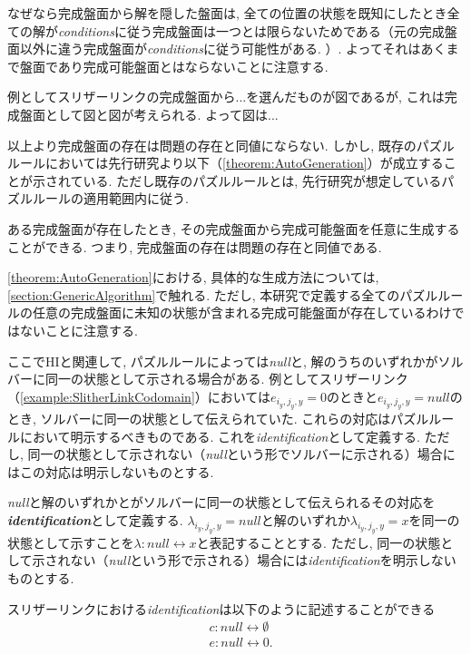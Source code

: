 なぜなら完成盤面から解を隠した盤面は, 全ての位置の状態を既知にしたとき全ての解が\textit{conditions}に従う完成盤面は一つとは限らないためである（元の完成盤面以外に違う完成盤面が\textit{conditions}に従う可能性がある. ）. よってそれはあくまで盤面であり完成可能盤面とはならないことに注意する.
\begin{example}
  例としてスリザーリンクの完成盤面から...を選んだものが図であるが, これは完成盤面として図と図が考えられる. よって図は...
\end{example}
以上より完成盤面の存在は問題の存在と同値にならない. しかし, 既存のパズルルールにおいては先行研究\cite{Fujiwara2022}より以下（\cref{theorem:AutoGeneration}）が成立することが示されている. ただし既存のパズルルールとは, 先行研究\cite{Fujiwara2022}が想定しているパズルルールの適用範囲内に従う.
\begin{theorem}\label{theorem:AutoGeneration}
  ある完成盤面が存在したとき, その完成盤面から完成可能盤面を任意に生成することができる. つまり, 完成盤面の存在は問題の存在と同値である.
\end{theorem}
\cref{theorem:AutoGeneration}における, 具体的な生成方法については, \cref{section:GenericAlgorithm}で触れる. ただし, 本研究で定義する全てのパズルルールの任意の完成盤面に未知の状態が含まれる完成可能盤面が存在しているわけではないことに注意する.

ここでHIと関連して, パズルルールによっては\textit{null}と, 解のうちのいずれかがソルバーに同一の状態として示される場合がある. 例としてスリザーリンク（\cref{example:SlitherLinkCodomain}）においては$e_{i_y,j_y,y} = 0$のときと$e_{i_y,j_y,y}=\textit{null}$のとき, ソルバーに同一の状態として伝えられていた. これらの対応はパズルルールにおいて明示するべきものである. これを\textit{identification}として定義する. ただし, 同一の状態として示されない（\textit{null}という形でソルバーに示される）場合にはこの対応は明示しないものとする.

\begin{definition}\label{definition:Identification}
  \textit{null}と解のいずれかとがソルバーに同一の状態として伝えられるその対応を\textbf{\textit{identification}}として定義する.
  $\lambda_{i_y,j_y,y}=\textit{null}$と解のいずれか$\lambda_{i_y,j_y,y}=x$を同一の状態として示すことを$\lambda\colon\textit{null}\leftrightarrow x$と表記することとする.
  ただし, 同一の状態として示されない（\textit{null}という形で示される）場合には\textit{identification}を明示しないものとする.
\end{definition}

\begin{example}\label{example:SlitherLinkIndentification}
  スリザーリンクにおける\textit{identification}は以下のように記述することができる
  \begin{align}
     & c\colon\textit{null}\leftrightarrow\emptyset \\
     & e\colon\textit{null}\leftrightarrow 0.
  \end{align}
\end{example}


